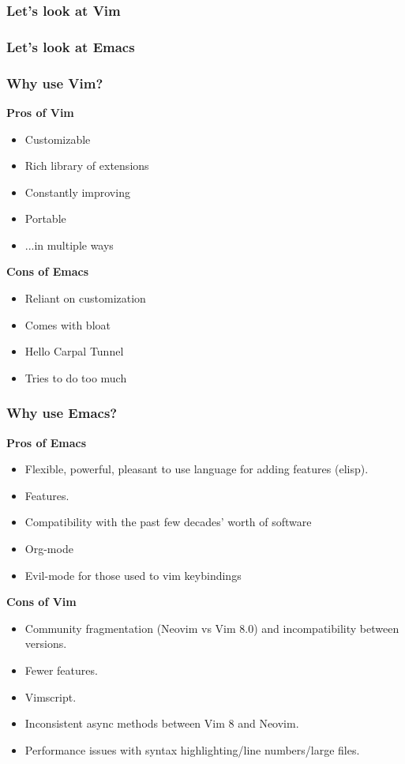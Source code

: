 \documentclass[8pt]{beamer}
\begin{document}
\begin{frame}
  \frametitle{Let's look at Vim}
\end{frame}

\begin{frame}
  \frametitle{Let's look at Emacs}
\end{frame}

\begin{frame}
  \frametitle{Why use Vim?}
  \begin{multicols}{2}
    \textbf{Pros of Vim}
    \begin{itemize}
    \item Customizable
		\item Rich library of extensions
		\item Constantly improving
		\item Portable
		\item ...in multiple ways
    \end{itemize}
    \columnbreak
    \textbf{Cons of Emacs}
    \begin{itemize}
    \item Reliant on customization
		\item Comes with bloat
		\item Hello Carpal Tunnel
		\item Tries to do too much
    \end{itemize}
  \end{multicols}
\end{frame}

\begin{frame}
  \frametitle{Why use Emacs?}
  \begin{multicols}{2}
    \textbf{Pros of Emacs}
    \begin{itemize}
    \item Flexible, powerful, pleasant to use language for adding
      features (elisp).
    \item Features.
    \item Compatibility with the past few decades' worth of software
    \item Org-mode
    \item Evil-mode for those used to vim keybindings
    \end{itemize}
    \columnbreak
    \textbf{Cons of Vim}
    \begin{itemize}
    \item Community fragmentation (Neovim vs Vim 8.0) and
      incompatibility between versions.
    \item Fewer features.
    \item Vimscript.
    \item Inconsistent async methods between Vim 8 and Neovim.
    \item Performance issues with syntax highlighting/line
      numbers/large files.
    \end{itemize}
  \end{multicols}
\end{frame}
\end{document}

